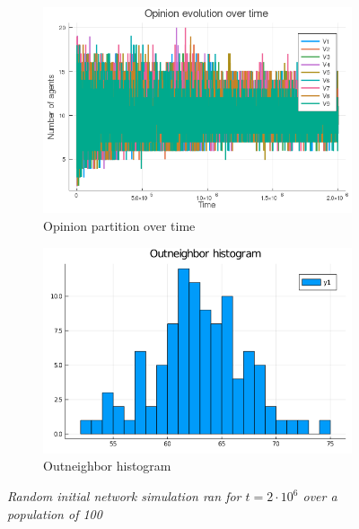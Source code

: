 \documentclass[12pt,openright,twoside]{book}
\begin{document}
\begin{appendices}
\begin{figure}[!htb]
\begin{subfigure}[b]{0.49\linewidth}
    \includegraphics[width=\linewidth]{figures/2_2_er/vote_evolution.png}
    \caption{Opinion partition over time}
\end{subfigure}
\begin{subfigure}[b]{0.49\linewidth}
    \includegraphics[width=\linewidth]{figures/2_2_er/OutneighborHistogram.png}
    \caption{Outneighbor histogram}
\end{subfigure}
\caption{\textit{{\small Random initial network simulation ran for $t=2\cdot 10^6$ over a population of 100}}}
\label{2_2_er}
\end{figure}


\end{appendices}
\end{document}
